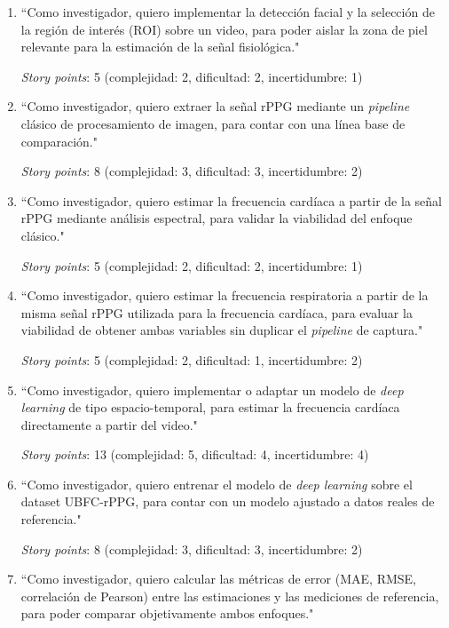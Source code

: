 \documentclass[
11pt, %
]{charter}
\begin{document}
	\begin{enumerate}
		\item ``Como investigador, quiero implementar la detección facial y la selección de la región de interés (ROI) sobre un video, para poder aislar la zona de piel relevante para la estimación de la señal fisiológica."
		
		\textit{Story points}: 5 (complejidad: 2, dificultad: 2, incertidumbre: 1)
		
		\item ``Como investigador, quiero extraer la señal rPPG mediante un \textit{pipeline} clásico de procesamiento de imagen, para contar con una línea base de comparación."
		
		\textit{Story points}: 8 (complejidad: 3, dificultad: 3, incertidumbre: 2)
		
		\item ``Como investigador, quiero estimar la frecuencia cardíaca a partir de la señal rPPG mediante análisis espectral, para validar la viabilidad del enfoque clásico."
		
		\textit{Story points}: 5 (complejidad: 2, dificultad: 2, incertidumbre: 1)
		
		\item ``Como investigador, quiero estimar la frecuencia respiratoria a partir de la misma señal rPPG utilizada para la frecuencia cardíaca, para evaluar la viabilidad de obtener ambas variables sin duplicar el \textit{pipeline} de captura."
		
		\textit{Story points}: 5 (complejidad: 2, dificultad: 1, incertidumbre: 2)
		
		\item ``Como investigador, quiero implementar o adaptar un modelo de \textit{deep learning} de tipo espacio-temporal, para estimar la frecuencia cardíaca directamente a partir del video."
		
		\textit{Story points}: 13 (complejidad: 5, dificultad: 4, incertidumbre: 4)
		
		\item ``Como investigador, quiero entrenar el modelo de \textit{deep learning} sobre el dataset UBFC-rPPG, para contar con un modelo ajustado a datos reales de referencia."
		
		\textit{Story points}: 8 (complejidad: 3, dificultad: 3, incertidumbre: 2)
		
		\item ``Como investigador, quiero calcular las métricas de error (MAE, RMSE, correlación de Pearson) entre las estimaciones y las mediciones de referencia, para poder comparar objetivamente ambos enfoques."
		

\end{enumerate}
\end{document}
